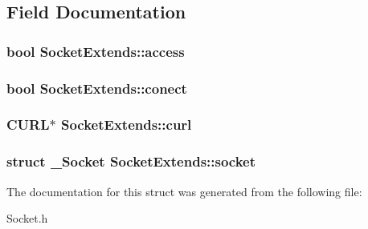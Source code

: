 \subsection{Field Documentation}
\subsubsection[{access}]{\setlength{\rightskip}{0pt plus 5cm}bool Socket\-Extends\-::access}\label{structSocketExtends_abbd73c1e9c1d309ae932bef7c8ca0023}
\subsubsection[{conect}]{\setlength{\rightskip}{0pt plus 5cm}bool Socket\-Extends\-::conect}\label{structSocketExtends_a7d952204fb2c469e6afd7cb2ea18ddf0}
\subsubsection[{curl}]{\setlength{\rightskip}{0pt plus 5cm}C\-U\-R\-L$\ast$ Socket\-Extends\-::curl}\label{structSocketExtends_ac4e09c356224fd201e7ef74a97834433}
\subsubsection[{socket}]{\setlength{\rightskip}{0pt plus 5cm}struct {\bf \-\_\-\-Socket} Socket\-Extends\-::socket}\label{structSocketExtends_a72db96b2d28f1217b357073131a5b8a1}


The documentation for this struct was generated from the following file\-:\begin{DoxyCompactItemize}
\item 
Socket.\-h\end{DoxyCompactItemize}
